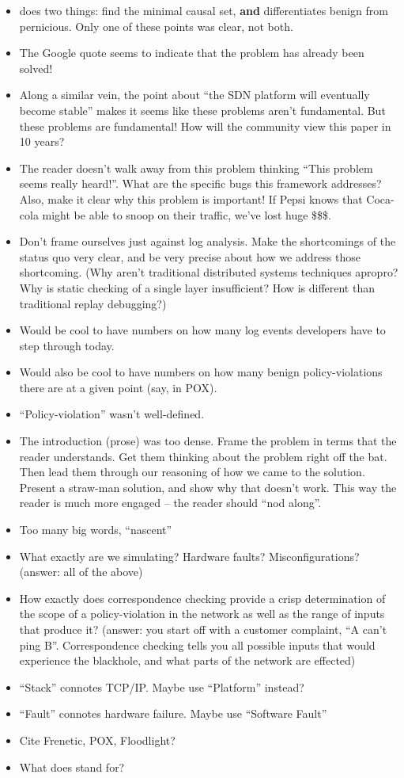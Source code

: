 \begin{itemize}
\item \simulator{} does two things: find the minimal causal set, {\bf and}
differentiates benign from pernicious. Only one of these points was clear, not
both.
\item The Google quote seems to indicate that the problem has already been solved!
\item Along a similar vein, the point about ``the SDN platform will eventually
become stable'' makes it seems like these problems aren't fundamental. But
these problems are fundamental! How will the community view this paper in 10
years?
\item The reader doesn't walk away from this problem thinking ``This problem
seems really heard!''. What are the specific bugs this framework addresses?
Also, make it clear why this problem is important! If Pepsi knows that
Coca-cola might be able to snoop on their traffic, we've lost huge \$\$\$.
\item Don't frame ourselves just against log analysis. Make 
the shortcomings of the status quo very clear, and be very precise about how
we address those shortcoming. (Why aren't traditional distributed systems
techniques apropro? Why is static checking of a single layer insufficient? How
is \simulator{} different than traditional replay debugging?)
\item Would be cool to have numbers on how many log events developers have to
step through today.
\item Would also be cool to have numbers on how many benign policy-violations
there are at a given point (say, in POX).
\item ``Policy-violation'' wasn't well-defined.
\item The introduction (prose) was too dense. Frame the problem in terms that
the reader understands. Get them thinking about the problem right off the bat.
Then lead them through our reasoning of how we came to the solution. Present
a straw-man solution, and show why that doesn't work. This way
the reader is much more engaged -- the reader should ``nod along''.
\item Too many big words, \eg{} ``nascent''
\item What exactly are we simulating? Hardware faults? Misconfigurations?
(answer: all of the above)
\item How exactly does correspondence checking provide a crisp determination of the scope of a policy-violation in the
network as well as the range of inputs that produce it? (answer: you start off
with a customer complaint, ``A can't ping B''. Correspondence checking tells
you all possible inputs that would experience the blackhole, and what parts of
the network are effected)
\item ``Stack'' connotes TCP/IP. Maybe use ``Platform'' instead?
\item ``Fault'' connotes hardware failure. Maybe use ``Software Fault''
\item Cite Frenetic, POX, Floodlight?
\item What does \projectname{} stand for?
\end{itemize}

